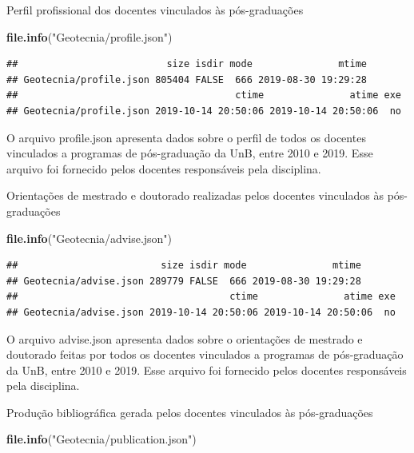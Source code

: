 \documentclass[]{article}
\newenvironment{Shaded}{\begin{snugshade}}{\end{snugshade}}
\newcommand{\KeywordTok}[1]{\textcolor[rgb]{0.13,0.29,0.53}{\textbf{#1}}}
\newcommand{\NormalTok}[1]{#1}
\newcommand{\StringTok}[1]{\textcolor[rgb]{0.31,0.60,0.02}{#1}}
\begin{document}
Perfil profissional dos docentes vinculados às pós-graduações

\begin{Shaded}
\begin{Highlighting}[]
\KeywordTok{file.info}\NormalTok{(}\StringTok{"Geotecnia/profile.json"}\NormalTok{)}
\end{Highlighting}
\end{Shaded}

\begin{verbatim}
##                          size isdir mode               mtime
## Geotecnia/profile.json 805404 FALSE  666 2019-08-30 19:29:28
##                                      ctime               atime exe
## Geotecnia/profile.json 2019-10-14 20:50:06 2019-10-14 20:50:06  no
\end{verbatim}

O arquivo profile.json apresenta dados sobre o perfil de todos os
docentes vinculados a programas de pós-graduação da UnB, entre 2010 e
2019. Esse arquivo foi fornecido pelos docentes responsáveis pela
disciplina.

Orientações de mestrado e doutorado realizadas pelos docentes vinculados
às pós-graduações

\begin{Shaded}
\begin{Highlighting}[]
\KeywordTok{file.info}\NormalTok{(}\StringTok{"Geotecnia/advise.json"}\NormalTok{)}
\end{Highlighting}
\end{Shaded}

\begin{verbatim}
##                         size isdir mode               mtime
## Geotecnia/advise.json 289779 FALSE  666 2019-08-30 19:29:28
##                                     ctime               atime exe
## Geotecnia/advise.json 2019-10-14 20:50:06 2019-10-14 20:50:06  no
\end{verbatim}

O arquivo advise.json apresenta dados sobre o orientações de mestrado e
doutorado feitas por todos os docentes vinculados a programas de
pós-graduação da UnB, entre 2010 e 2019. Esse arquivo foi fornecido
pelos docentes responsáveis pela disciplina.

Produção bibliográfica gerada pelos docentes vinculados às
pós-graduações

\begin{Shaded}
\begin{Highlighting}[]
\KeywordTok{file.info}\NormalTok{(}\StringTok{"Geotecnia/publication.json"}\NormalTok{)}
\end{Highlighting}
\end{Shaded}
\end{document}
